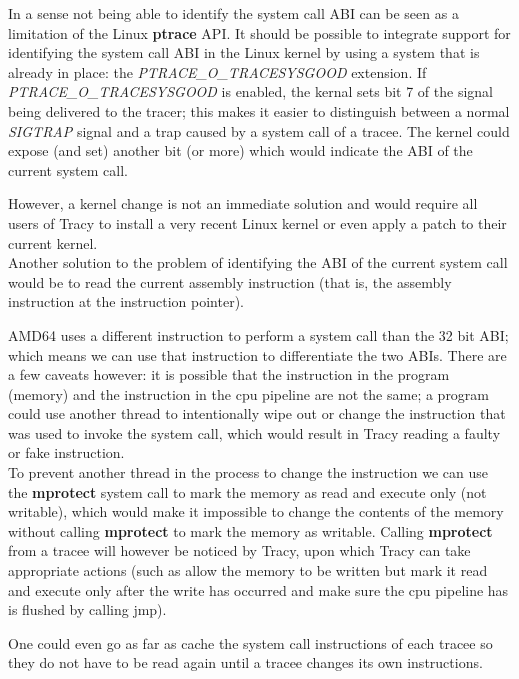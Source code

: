 \documentclass[a4paper, 10pt]{report}
\begin{document}
In a sense not being able to identify the system call ABI can be seen as a
limitation of the Linux \textbf{ptrace} API. It should be possible to
integrate support for identifying the system call ABI in the Linux kernel
by using a system that is already in place: the \textit{PTRACE\_O\_TRACESYSGOOD}
extension. If \textit{PTRACE\_O\_TRACESYSGOOD} is enabled, the kernal sets bit 7
of the signal being delivered to the tracer; this makes it easier to distinguish
between a normal \textit{SIGTRAP} signal and a trap caused by a system call of
a tracee. The kernel could expose (and set) another bit (or more) which would
indicate the ABI of the current system call.

However, a kernel change is not an immediate solution and would require all
users of Tracy to install a very recent Linux kernel or even apply a patch
to their current kernel. \\

Another solution to the problem of identifying the ABI of the current
system call would be to read the current assembly instruction (that is,
the assembly instruction at the instruction pointer).

AMD64 uses a
different instruction to perform a system call than the 32 bit ABI; which
means we can use that instruction to differentiate the two ABIs. There are a
few caveats however: it is possible that the instruction in the program (memory)
and the instruction in the cpu pipeline are not the same; a program could use
another thread to intentionally wipe out or change the instruction that was
used to invoke the system call, which would result in Tracy reading a faulty
or fake instruction. \\

To prevent another thread in the process to change the instruction we can
use the \textbf{mprotect} system call to mark the memory as read and execute
only (not writable), which would make it impossible to change the contents of
the memory without calling \textbf{mprotect} to mark the memory as writable.
Calling \textbf{mprotect} from a tracee will however be noticed by Tracy,
upon which Tracy can take appropriate actions (such as allow the memory to be
written but mark it read and execute only after the write has occurred and make
sure the cpu pipeline has is flushed by calling jmp).

One could even go as far as cache the system call instructions of each tracee
so they do not have to be read again until a tracee changes its own
instructions.
\end{document}
